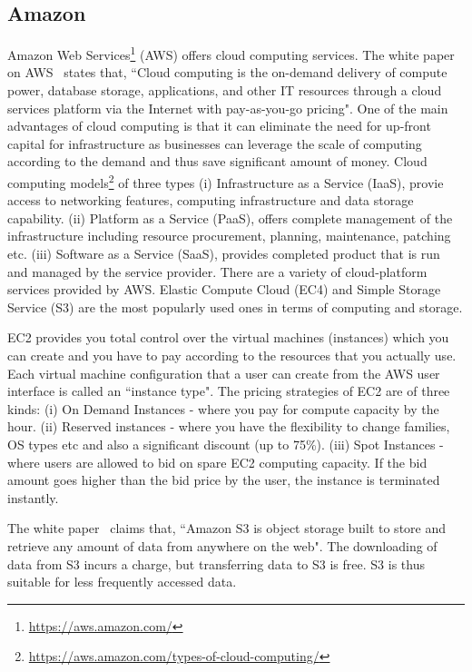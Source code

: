 \subsection{Amazon}
Amazon Web Services\footnote{\url{https://aws.amazon.com/}} (AWS) offers cloud computing services. The white paper on AWS~\cite{Amazon-Web-Services} states that, ``Cloud computing is the on-demand delivery of compute power, database storage, applications, and other IT resources through a cloud services platform via the Internet with pay-as-you-go pricing". One of the main advantages of cloud computing is that it can eliminate the need for up-front capital for infrastructure as businesses can leverage the scale of computing according to the demand and thus save significant amount of money. Cloud computing models\footnote{\url{https://aws.amazon.com/types-of-cloud-computing/}} of three types (i) Infrastructure as a Service (IaaS), provie access to networking features, computing infrastructure and data storage capability. (ii) Platform as a Service (PaaS), offers complete management of the infrastructure including resource procurement, planning, maintenance, patching etc. (iii) Software as a Service (SaaS), provides completed product that is run and managed by the service provider. There are a variety of cloud-platform services provided by AWS. Elastic Compute Cloud (EC4) and Simple Storage Service (S3) are the most popularly used ones in terms of computing and storage.

EC2 provides you total control over the virtual machines (instances) which you can create and you have to pay according to the resources that you actually use. Each virtual machine configuration that a user can create from the AWS user interface is called an ``instance type". The pricing strategies of EC2 are of three kinds: (i) On Demand Instances - where you pay for compute capacity by the hour. (ii) Reserved instances - where you have the flexibility to change families, OS types etc and also a significant discount (up to 75\%). (iii) Spot Instances - where users are allowed to bid on spare EC2 computing capacity. If the bid amount goes higher than the bid price by the user, the instance is terminated instantly.

The white paper~\cite{Amazon-Web-Services} claims that, ``Amazon S3 is object storage built to store and retrieve any amount of data from anywhere on the web". The downloading of data from S3 incurs a charge, but transferring data to S3 is free. S3 is thus suitable for less frequently accessed data.

